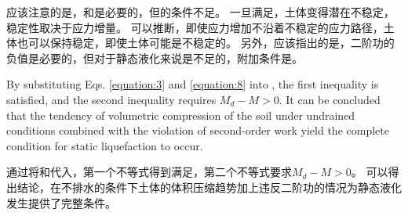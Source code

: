 \begin{ParaColumn}
    \switchcolumn

    应该注意的是，和是必要的，但的条件不足。 一旦满足，土体变得潜在不稳定，稳定性取决于应力增量。 可以推断，即使应力增加不沿着不稳定的应力路径，土体也可以保持稳定，即使土体可能是不稳定的。 另外，应该指出的是，二阶功的负值是必要的，但对于静态液化来说是不足的\citep{Chu2001}，附加条件是\citep{Lade1992}。

    \switchcolumn*

    \noindent
    By substituting Eqs. \ref{equation:3} and \ref{equation:8} into , the first inequality is satisfied, and the second inequality requires $M_d-M>0$. It can be concluded that the tendency of volumetric compression of the soil under undrained conditions combined with the violation of second-order work yield the complete condition for static liquefaction to occur.

    \switchcolumn

    \noindent
    通过将和代入，第一个不等式得到满足，第二个不等式要求$M_d-M>0$。 可以得出结论，在不排水的条件下土体的体积压缩趋势加上违反二阶功的情况为静态液化发生提供了完整条件。

\end{ParaColumn}